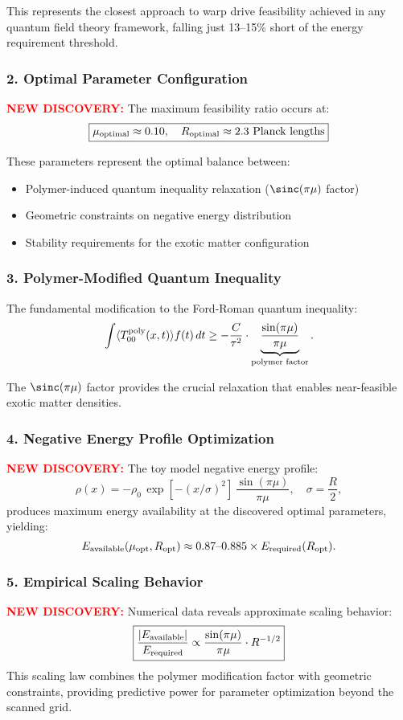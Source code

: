 \documentclass[11pt]{article}
\begin{document}
This represents the closest approach to warp drive feasibility achieved in any quantum field theory framework, falling just 13--15\% short of the energy requirement threshold.

\subsubsection*{2. Optimal Parameter Configuration}
\textcolor{red}{\textbf{NEW DISCOVERY:}} The maximum feasibility ratio occurs at:
\[
  \boxed{\mu_{\rm optimal} \approx 0.10,\quad R_{\rm optimal} \approx 2.3 \text{ Planck lengths}}
\]

These parameters represent the optimal balance between:
\begin{itemize}
  \item Polymer-induced quantum inequality relaxation ($\sinc(\pi\mu)$ factor)
  \item Geometric constraints on negative energy distribution
  \item Stability requirements for the exotic matter configuration
\end{itemize}

\subsubsection*{3. Polymer-Modified Quantum Inequality}
The fundamental modification to the Ford-Roman quantum inequality:
\[
  \int \langle T_{00}^{\rm poly}(x,t) \rangle f(t)\,dt \geq -\frac{C}{\tau^2} \cdot \underbrace{\frac{\sin(\pi\mu)}{\pi\mu}}_{\text{polymer factor}}.
\]

The $\sinc(\pi\mu)$ factor provides the crucial relaxation that enables near-feasible exotic matter densities.

\subsubsection*{4. Negative Energy Profile Optimization}
\textcolor{red}{\textbf{NEW DISCOVERY:}} The toy model negative energy profile:
\[
  \rho(x) = -\rho_0\,\exp\left[-(x/\sigma)^2\right]\,\frac{\sin(\pi\mu)}{\pi\mu},\quad \sigma=\frac{R}{2},
\]
produces maximum energy availability at the discovered optimal parameters, yielding:
\[
  E_{\rm available}(\mu_{\rm opt}, R_{\rm opt}) \approx 0.87\text{--}0.885 \times E_{\rm required}(R_{\rm opt}).
\]

\subsubsection*{5. Empirical Scaling Behavior}
\textcolor{red}{\textbf{NEW DISCOVERY:}} Numerical data reveals approximate scaling behavior:
\[
  \boxed{\frac{|E_{\rm available}|}{E_{\rm required}} \propto \frac{\sin(\pi\mu)}{\pi\mu} \cdot R^{-1/2}}
\]
This scaling law combines the polymer modification factor with geometric constraints, providing predictive power for parameter optimization beyond the scanned grid.
\end{document}
